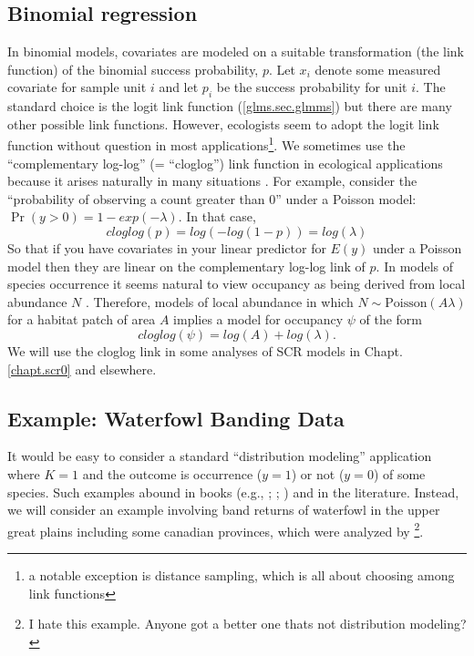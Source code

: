 \subsection{Binomial regression}

In binomial models, covariates are modeled on a suitable
transformation (the link function) of the binomial success
probability, $p$.  Let $x_{i}$ denote some measured covariate for
sample unit $i$ and let $p_{i}$ be the success probability for unit $i$.
The standard choice is the logit link function (\ref{glms.sec.glmms}) but there are many other possible link functions. However, ecologists seem
to adopt the logit link function without question in most
applications\footnote{a notable exception is distance sampling, which
  is all about choosing among link functions}.  We sometimes use the
``complementary log-log'' (= ``cloglog'') link function in ecological
applications because it arises naturally in many situations
\citep[][p. 150]{royle_dorazio:2008}. For example, consider the
``probability of observing a count greater than 0'' under a Poisson
model: $\Pr(y>0) = 1-exp(- \lambda)$. In that case,
\[
cloglog(p) =log(- log(1-p)) = log(\lambda)
\]
So that if you have covariates in your linear predictor for $E(y)$
under a Poisson model then they are linear on the complementary
log-log link of $p$.
In models of species occurrence it seems natural to view occupancy as
being derived from local abundance $N$
\citep{royle_nichols:2003,royle_dorazio:2006,dorazio:2007}.
Therefore,
models of local abundance in which $N \sim \mbox{Poisson}(A \lambda)$
for a habitat patch of area $A$ implies a model for occupancy $\psi$
of the form
\[
 cloglog(\psi) = log(A) + log(\lambda).
\]
We will use the cloglog link in some analyses of
SCR models in Chapt. \ref{chapt.scr0} and elsewhere.


\subsection{ Example: Waterfowl Banding Data}

It would be easy to consider a standard ``distribution modeling''
application where $K=1$ and the outcome is occurrence ($y=1$) or not
($y=0$) of some species. Such examples abound in books (e.g.,
\citet[][ch. 3]{royle_dorazio:2008}; \citet[][ch. 21]{kery:2010};
\citet[][ch. 13]{kery_schaub:2011}) and in the literature.
Instead, we will
consider an example involving band returns of waterfowl in the upper great plains including some canadian provinces, which were
analyzed by \citet{royle_dubovsky:2001}\footnote{I hate this example.
  Anyone got a better one thats not distribution modeling?}.

